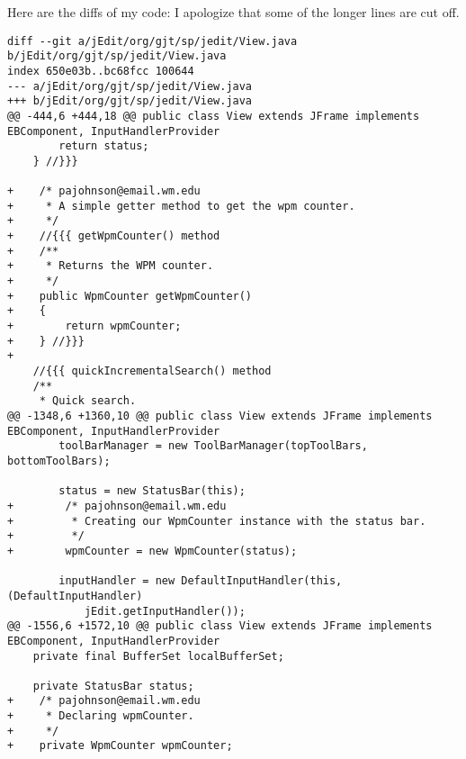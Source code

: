 \documentclass[12pt]{article}
\begin{document}
Here are the diffs of my code: I apologize that some of the longer lines are cut off.
\begin{verbatim}
diff --git a/jEdit/org/gjt/sp/jedit/View.java b/jEdit/org/gjt/sp/jedit/View.java
index 650e03b..bc68fcc 100644
--- a/jEdit/org/gjt/sp/jedit/View.java
+++ b/jEdit/org/gjt/sp/jedit/View.java
@@ -444,6 +444,18 @@ public class View extends JFrame implements EBComponent, InputHandlerProvider
 		return status;
 	} //}}}
 
+    /* pajohnson@email.wm.edu
+     * A simple getter method to get the wpm counter.
+     */
+    //{{{ getWpmCounter() method
+    /**
+     * Returns the WPM counter.
+     */
+    public WpmCounter getWpmCounter()
+    {
+        return wpmCounter;
+    } //}}}
+
 	//{{{ quickIncrementalSearch() method
 	/**
 	 * Quick search.
@@ -1348,6 +1360,10 @@ public class View extends JFrame implements EBComponent, InputHandlerProvider
 		toolBarManager = new ToolBarManager(topToolBars, bottomToolBars);
 
 		status = new StatusBar(this);
+        /* pajohnson@email.wm.edu
+         * Creating our WpmCounter instance with the status bar.
+         */
+        wpmCounter = new WpmCounter(status);
 
 		inputHandler = new DefaultInputHandler(this,(DefaultInputHandler)
 			jEdit.getInputHandler());
@@ -1556,6 +1572,10 @@ public class View extends JFrame implements EBComponent, InputHandlerProvider
 	private final BufferSet localBufferSet;
 
 	private StatusBar status;
+    /* pajohnson@email.wm.edu
+     * Declaring wpmCounter.
+     */
+    private WpmCounter wpmCounter;
 

\end{verbatim}
\end{document}
